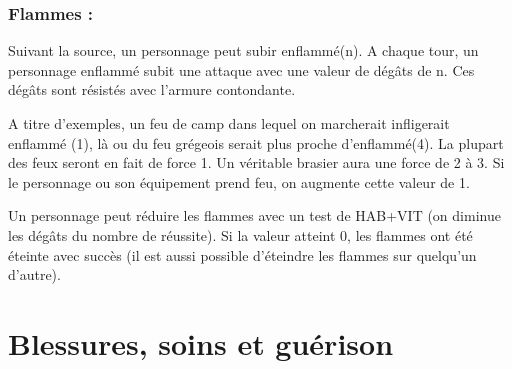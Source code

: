 \documentclass[10pt,a4paper,twocolumn]{book}
\begin{document}
\subsection*{Flammes :}
Suivant la source, un personnage peut subir enflammé(n). A chaque tour, un personnage enflammé subit une attaque avec une valeur de dégâts de n. Ces dégâts sont résistés avec l'armure contondante.

A titre d’exemples, un feu de camp dans lequel on marcherait infligerait enflammé (1), là ou du feu grégeois serait plus proche d’enflammé(4).
La plupart des feux seront en fait de force 1. Un véritable brasier aura une force de 2 à 3. Si le personnage ou son équipement prend feu, on augmente cette valeur de 1.


Un personnage peut réduire les flammes avec un test de HAB+VIT (on diminue les dégâts du nombre de réussite). Si la valeur atteint 0, les flammes ont été éteinte avec succès (il est aussi possible d’éteindre les flammes sur quelqu’un d’autre).
\chapter{Blessures, soins et guérison}
\end{document}
